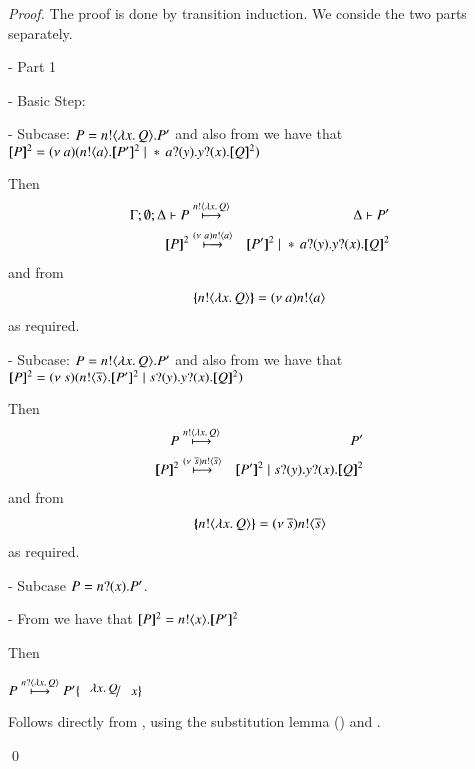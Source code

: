 \iftodo
\begin{proof}
	\noi The proof is done by transition induction.
	We conside the two parts separately.

	\noi - Part 1

	\noi - Basic Step:
 
	\noi - Subcase: $P= n ! \langle \lambda x.\,Q \rangle . P'$ 
	and also from 
	we have that
	$\pmap{P}{2} = \newsp{a}{\bout{n}{a} \pmap{P'}{2} \Par \repl{} \binp{a}{y} \binp{y}{x} \pmap{Q}{2}}$

	\noi Then
%
	\begin{eqnarray*}
		\Gamma; \es; \Delta \proves P &\hby{\bactout{n}{\abs{x}{Q}}} & \Delta \proves P'\\
		\pmap{P}{2} &\hby{\news{a} \bactout{n}{a}}& \pmap{P'}{2} \Par \repl{} \binp{a}{y} \binp{y}{x} \pmap{Q}{2}
	\end{eqnarray*}
%
	\noi and from 
%
	\begin{eqnarray*}
		\{\!\!\{n ! \langle \lambda x.\,Q \rangle\}\!\!\} = (\nu\ a) n ! \langle a \rangle
	\end{eqnarray*}
%
	\noi as required.

	\noi - Subcase: $P= n ! \langle \lambda x.\,Q \rangle . P'$ 
	and also from 
	we have that\\
	$\pmap{P}{2} = \newsp{s}{\bout{n}{\dual{s}} \pmap{P'}{2} \Par \binp{s}{y} \binp{y}{x} \pmap{Q}{2}}$

	\noi Then
%
	\begin{eqnarray*}
		P &\hby{\bactout{n}{\abs{x}{Q}}} & P'\\
		\pmap{P}{2} &\hby{\news{\dual{s}} \bactout{n}{\dual{s}}}& \pmap{P'}{2} \Par \binp{s}{y} \binp{y}{x} \pmap{Q}{2}
	\end{eqnarray*}
%
	\noi and from 
%
	\begin{eqnarray*}
		\{\!\!\{n ! \langle \lambda x.\,Q \rangle\}\!\!\} = (\nu\ \overline{s}) n ! \langle \overline{s} \rangle
	\end{eqnarray*}
%
	\noi as required.

	\noi - Subcase $P = n ? (x) . P'$.

	\noi - From 
	we have that
	$\pmap{P}{2} = \bout{n}{x} \pmap{P'}{2}$

	\noi Then

	\noi $P \hby{\bactinp{n}{\abs{x}{Q}}} P' \subst{\abs{x}{Q}}{x}$

	
	
	
	
\iftodo
\else
	Follows directly from , using the substitution lemma ()
	and .	
\fi

	\qed
\end{proof}
